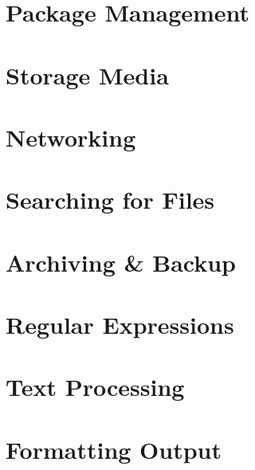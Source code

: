 \documentclass[oneside]{book}
\numberwithin{equation}{section}
\begin{document}
\section{Package Management}


\section{Storage Media}


\section{Networking}


\section{Searching for Files}


\section{Archiving \& Backup}


\section{Regular Expressions}


\section{Text Processing}


\section{Formatting Output}
\end{document}
